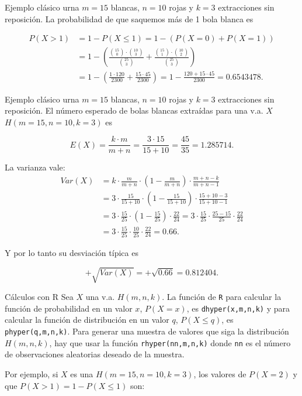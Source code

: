 \documentclass[
  ignorenonframetext,
  aspectratio=169]{beamer}
\begin{document}
\begin{frame}{Ejemplo clásico urna \(m=15\) blancas, \(n=10\) rojas y
\(k=3\) extracciones sin reposición.}
\protect\hypertarget{ejemplo-cluxe1sico-urna-m15-blancas-n10-rojas-y-k3-extracciones-sin-reposiciuxf3n.-2}{}
La probabilidad de que saquemos más de 1 bola blanca es

\[
\begin{array}{rl}
P(X> 1)&= 1-P(X\leq 1)=1-(P(X=0)+P(X=1))\\
&=
1-\left(\frac{\binom{15}{0}\cdot \binom{10}{3}}{\binom{25}{3}}+
\frac{\binom{15}{1}\cdot \binom{10}{2}}{\binom{25}{3}}\right)\\
&=
1-\left(
\frac{1\cdot120 }{2300}+\frac{15\cdot45 }{2300}
\right)=1-\frac{120+15\cdot 45}{2300}=0.6543478.
\end{array}
\]
\end{frame}

\begin{frame}{Ejemplo clásico urna \(m=15\) blancas, \(n=10\) rojas y
\(k=3\) extracciones sin reposición.}
\protect\hypertarget{ejemplo-cluxe1sico-urna-m15-blancas-n10-rojas-y-k3-extracciones-sin-reposiciuxf3n.-3}{}
El número esperado de bolas blancas extraídas para una v.a. \(X\)
\(H(m=15,n=10,k=3)\) es

\[E(X)=\frac{k\cdot m}{m+n}=\frac{3\cdot 15}{15+10}=\frac{45}{35}=1.285714.\]

La varianza vale: \[
\begin{array}{rl}
Var(X)&=k\cdot\frac{m}{m+n}\cdot\left(1-\frac{m}{m+n}\right) \cdot\frac{m+n-k}{m+n-1}\\
&=3\cdot\frac{15}{15+10}\cdot\left(1-\frac{15}{15+10}\right) \cdot\frac{15+10-3}{15+10-1}\\
&=
3\cdot\frac{15}{25}\cdot\left(1-\frac{15}{25}\right) \cdot\frac{22}{24}= 
3\cdot\frac{15}{25}\cdot\frac{25-15}{25} \cdot\frac{22}{24}\\
&=
3\cdot\frac{15}{25}\cdot\frac{10}{25}\cdot\frac{22}{24}=0.66.
\end{array}
\]

Y por lo tanto su desviación típica es

\[
+\sqrt{Var(X)}=+\sqrt{0.66}=0.812404.
\]
\end{frame}

\begin{frame}[fragile]{Cálculos con R}
\protect\hypertarget{cuxe1lculos-con-r-9}{}
Sea \(X\) una v.a. \(H(m,n,k)\). La función de \texttt{R} para calcular
la función de probabilidad en un valor \(x\), \(P(X=x)\), es
\texttt{dhyper(x,m,n,k)} y para calcular la función de distribución en
un valor \(q\), \(P(X\leq q)\), es \texttt{phyper(q,m,n,k)}. Para
generar una muestra de valores que siga la distribución \(H(m,n,k)\),
hay que usar la función \texttt{rhyper(nn,m,n,k)} donde \texttt{nn} es
el número de observaciones aleatorias deseado de la muestra.

Por ejemplo, si \(X\) es una \(H(m=15,n=10,k=3)\), los valores de
\(P(X=2)\) y que \(P(X>1)=1-P(X\leq 1)\) son:
\end{frame}
\end{document}
